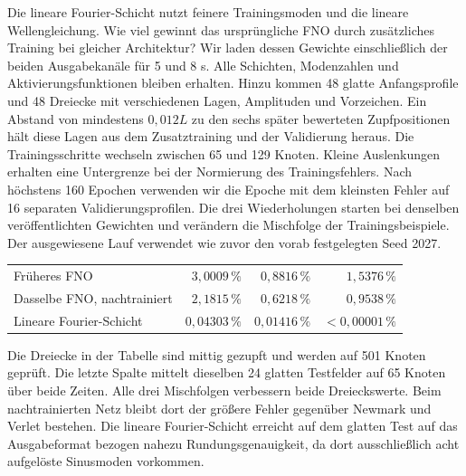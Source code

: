 Die lineare Fourier-Schicht nutzt feinere Trainingsmoden und die lineare Wellengleichung. Wie viel gewinnt das ursprüngliche FNO durch zusätzliches Training bei gleicher Architektur?
Wir laden dessen Gewichte einschließlich der beiden Ausgabekanäle für 5 und 8 s. Alle Schichten, Modenzahlen und Aktivierungsfunktionen bleiben erhalten. Hinzu kommen 48 glatte Anfangsprofile und 48 Dreiecke mit verschiedenen Lagen, Amplituden und Vorzeichen. Ein Abstand von mindestens \(0{,}012L\) zu den sechs später bewerteten Zupfpositionen hält diese Lagen aus dem Zusatztraining und der Validierung heraus. Die Trainingsschritte wechseln zwischen 65 und 129 Knoten. Kleine Auslenkungen erhalten eine Untergrenze bei der Normierung des Trainingsfehlers.
Nach höchstens 160 Epochen verwenden wir die Epoche mit dem kleinsten Fehler auf 16 separaten Validierungsprofilen. Die drei Wiederholungen starten bei denselben veröffentlichten Gewichten und verändern die Mischfolge der Trainingsbeispiele. Der ausgewiesene Lauf verwendet wie zuvor den vorab festgelegten Seed 2027.
{\tblstart\begin{tabularx}{\linewidth}{@{}Yrrr@{}}\toprule
{}&&&\\\midrule
Früheres FNO&\(3{,}0009\,\%\)&\(0{,}8816\,\%\)&\(1{,}5376\,\%\)\\
Dasselbe FNO, nachtrainiert&\(2{,}1815\,\%\)&\(0{,}6218\,\%\)&\(0{,}9538\,\%\)\\
Lineare Fourier-Schicht&\(0{,}04303\,\%\)&\(0{,}01416\,\%\)&\(<0{,}00001\,\%\)\\\bottomrule\end{tabularx}\par}
Die Dreiecke in der Tabelle sind mittig gezupft und werden auf 501 Knoten geprüft. Die letzte Spalte mittelt dieselben 24 glatten Testfelder auf 65 Knoten über beide Zeiten. Alle drei Mischfolgen verbessern beide Dreieckswerte. Beim nachtrainierten Netz bleibt dort der größere Fehler gegenüber Newmark und Verlet bestehen. Die lineare Fourier-Schicht erreicht auf dem glatten Test auf das Ausgabeformat bezogen nahezu Rundungsgenauigkeit, da dort ausschließlich acht aufgelöste Sinusmoden vorkommen.

